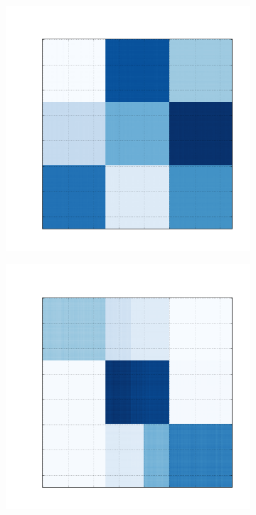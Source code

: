 \documentclass[
    12pt,                %
    oneside,            %
    a4paper,            %
    english,            %
    brazil                %
    ]{abntex2ppgsi}
\begin{document}
\begin{figure}[H]
\begin{subfigure}[b]{0.18\textwidth}
        \caption{}
    \end{subfigure}
    \begin{subfigure}[b]{0.18\textwidth}
        \includegraphics[width=\textwidth]{img/c-reconstruction-onmtf.png}
        \caption{}
    \end{subfigure}
    \begin{subfigure}[b]{0.18\textwidth}
        \includegraphics[width=\textwidth]{img/d-reconstruction-onmtf.png}

\end{subfigure}
\end{figure}
\end{document}
